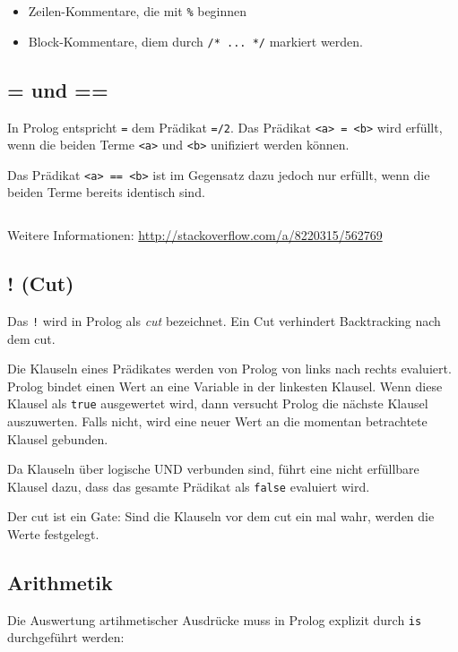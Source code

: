 \begin{itemize}
    \item Zeilen-Kommentare, die mit \verb+%+ beginnen
    \item Block-Kommentare, diem durch \verb+/* ... */+ markiert werden.
\end{itemize}

\subsection{= und ==}
In Prolog entspricht \texttt{=} dem Prädikat \texttt{=/2}. Das Prädikat \texttt{<a> = <b>} wird
erfüllt, wenn die beiden Terme \texttt{<a>} und \texttt{<b>} unifiziert werden
können.

Das Prädikat \texttt{<a> == <b>} ist im Gegensatz dazu jedoch nur erfüllt, wenn
die beiden Terme bereits identisch sind.

\begin{beispiel}[= und ==]
    \inputminted[numbersep=5pt, tabsize=4]{prolog}{scripts/prolog/equal.pl}
\end{beispiel}

Weitere Informationen: \url{http://stackoverflow.com/a/8220315/562769}

\subsection{! (Cut)}%
Das \texttt{!} wird in Prolog als \textit{cut} bezeichnet. Ein Cut verhindert
Backtracking nach dem cut.

Die Klauseln eines Prädikates werden von Prolog von links nach rechts evaluiert.
Prolog bindet einen Wert an eine Variable in der linkesten Klausel. Wenn diese
Klausel als \texttt{true} ausgewertet wird, dann versucht Prolog die nächste
Klausel auszuwerten. Falls nicht, wird eine neuer Wert an die momentan
betrachtete Klausel gebunden.

Da Klauseln über logische UND verbunden sind, führt eine nicht erfüllbare
Klausel dazu, dass das gesamte Prädikat als \texttt{false} evaluiert wird.

Der cut ist ein Gate: Sind die Klauseln vor dem cut ein mal wahr, werden die
Werte festgelegt.

\subsection{Arithmetik}
Die Auswertung artihmetischer Ausdrücke muss in Prolog explizit durch \texttt{is}
durchgeführt werden:

